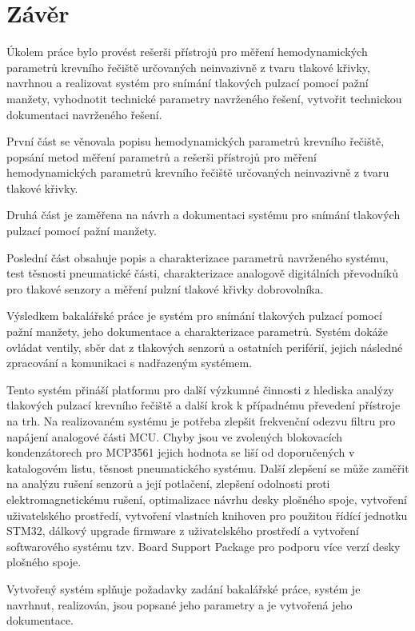 \documentclass{ctuthesis}
\begin{document}
\chapter{Závěr}
Úkolem práce bylo provést rešerši přístrojů pro měření hemodynamických parametrů krevního řečiště určovaných neinvazivně z tvaru
tlakové křivky, navrhnou a realizovat systém pro snímání tlakových pulzací pomocí pažní manžety, vyhodnotit technické parametry navrženého řešení, vytvořit technickou dokumentaci navrženého řešení.
\par
První část se věnovala popisu hemodynamických parametrů krevního řečiště, popsání metod měření parametrů a rešerši přístrojů pro měření hemodynamických parametrů krevního řečiště určovaných neinvazivně z tvaru
tlakové křivky.
\par
Druhá část je zaměřena na návrh a dokumentaci systému pro snímání tlakových pulzací pomocí pažní manžety.
\par
Poslední část obsahuje popis a charakterizace parametrů navrženého systému, test těsnosti pneumatické části, charakterizace analogově digitálních převodníků pro tlakové senzory a měření pulzní tlakové křivky dobrovolníka.
\par
Výsledkem bakalářské práce je systém pro snímání tlakových pulzací pomocí pažní manžety, jeho dokumentace a charakterizace parametrů. Systém dokáže ovládat ventily, sběr dat z tlakových senzorů a ostatních periférií, jejich následné zpracování a komunikaci s nadřazeným systémem.
\par
Tento systém přináší platformu pro další výzkumné činnosti z hlediska analýzy tlakových pulzací krevního řečiště a další krok k případnému převedení přístroje na trh. Na realizovaném systému je potřeba zlepšit frekvenční odezvu filtru pro napájení analogové části MCU. Chyby jsou ve zvolených blokovacích kondenzátorech
pro MCP3561 jejich hodnota se liší od doporučených v katalogovém listu, těsnost pneumatického systému. Další zlepšení se může zaměřit na analýzu rušení senzorů a její potlačení, zlepšení odolnosti proti elektromagnetickému rušení, optimalizace návrhu desky plošného spoje, vytvoření uživatelského prostředí, vytvoření vlastních knihoven pro použitou
řídící jednotku STM32, dálkový upgrade firmware z uživatelského prostředí a vytvoření softwarového systému tzv. Board Support Package pro podporu více verzí desky plošného spoje.
\par
Vytvořený systém splňuje požadavky zadání bakalářské práce, systém je navrhnut, realizován, jsou popsané jeho parametry a je vytvořená jeho dokumentace.
\end{document}
